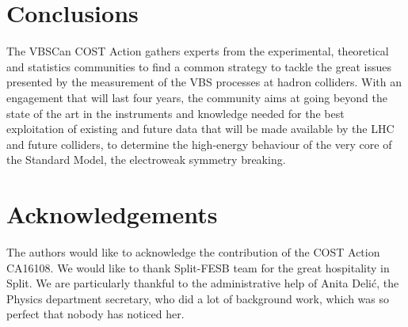 \documentclass[12pt]{article}
\begin{document}


\section*{Conclusions}

The VBSCan COST Action
gathers experts from the experimental, theoretical and statistics communities
to find a common strategy to tackle the great issues presented
by the measurement of the VBS processes at hadron colliders.
With an engagement that will last four years,
the community aims at going beyond the state of the art
in the instruments and knowledge needed for the best exploitation
of existing and future data 
that will be made available by the LHC and future colliders,
to determine the high-energy behaviour of the very core of the Standard Model,
the electroweak symmetry breaking.

\section*{Acknowledgements}

The authors would like to acknowledge the contribution of the COST Action CA16108.
We would like to thank Split-FESB team for the great hospitality in Split. 
We are particularly thankful to the administrative help of Anita Deli\'c, 
the Physics department secretary,
who did a lot of background work, 
which was so perfect that nobody has noticed her.

%
% 

\printbibliography
\end{document}
